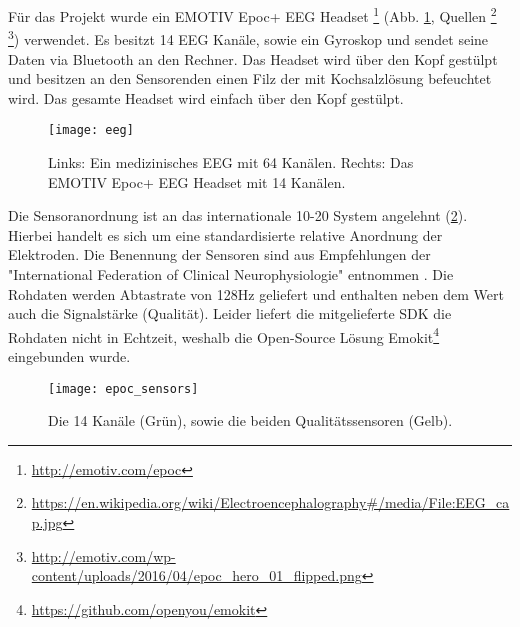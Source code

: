 \label{chap:eeg}
Für das Projekt wurde ein EMOTIV Epoc+ EEG Headset \footnote{\url{http://emotiv.com/epoc}} (Abb. \ref{fig:eeg}, Quellen \footnote{\url{https://en.wikipedia.org/wiki/Electroencephalography\#/media/File:EEG_cap.jpg}} \footnote{\url{http://emotiv.com/wp-content/uploads/2016/04/epoc_hero_01_flipped.png}}) verwendet. Es besitzt 14 EEG Kanäle, sowie ein Gyroskop und sendet seine Daten via Bluetooth an den Rechner. Das Headset wird über den Kopf gestülpt und besitzen an den Sensorenden einen Filz der mit Kochsalzlösung befeuchtet wird. Das gesamte Headset wird einfach über den Kopf gestülpt.

\begin{figure}[h] 
  \begin{center}
    \texttt{[image: eeg]}
    \caption[Medzinisches EEG / EMOTIV Epoc+]{Links: Ein medizinisches EEG mit 64 Kanälen. Rechts: Das EMOTIV Epoc+ EEG Headset mit 14 Kanälen.\label{fig:eeg}}
  \end{center}
\end{figure}

Die Sensoranordnung ist an das internationale 10-20 System \cite{10-20}  angelehnt (\ref{fig:epoc_sensors}). Hierbei handelt es sich um eine standardisierte relative Anordnung der Elektroden. Die Benennung der Sensoren  sind aus Empfehlungen der "International Federation of Clinical Neurophysiologie" entnommen \cite{ifcn}. Die Rohdaten werden Abtastrate von 128Hz geliefert und enthalten neben dem Wert auch die Signalstärke (Qualität). Leider liefert die mitgelieferte SDK die Rohdaten nicht in Echtzeit, weshalb die Open-Source Lösung Emokit\footnote{\url{https://github.com/openyou/emokit}} eingebunden wurde.

\begin{figure}[h] 
  \begin{center}
    \texttt{[image: epoc\_sensors]}
    \caption[EEG Sensoranordnung]{Die 14 Kanäle (Grün), sowie die beiden Qualitätssensoren (Gelb).\label{fig:epoc_sensors}}
  \end{center}
\end{figure}